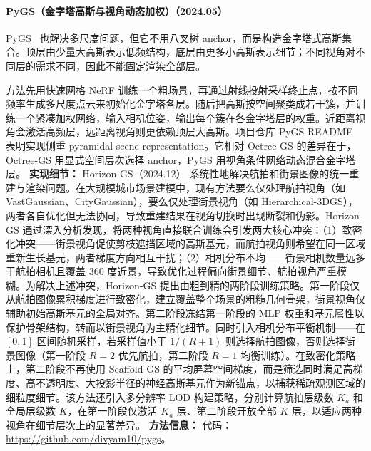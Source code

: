 \paragraph{PyGS（金字塔高斯与视角动态加权）（2024.05）}
PyGS~\cite{2405_16829} 也解决多尺度问题，但它不用八叉树 anchor，而是构造金字塔式高斯集合。顶层由少量大高斯表示低频结构，底层由更多小高斯表示细节；不同视角对不同层的需求不同，因此不能固定渲染全部层。

方法先用快速网格 NeRF 训练一个粗场景，再通过射线投射采样终止点，按不同频率生成多尺度点云来初始化金字塔各层。随后把高斯按空间聚类成若干簇，并训练一个紧凑加权网络，输入相机位姿，输出每个簇在各金字塔层的权重。近距离视角会激活高频层，远距离视角则更依赖顶层大高斯。项目仓库 PyGS README 表明实现侧重 pyramidal scene representation。它相对 Octree-GS 的差异在于，Octree-GS 用显式空间层次选择 anchor，PyGS 用视角条件网络动态混合金字塔层。
\textbf{实现细节：} Horizon-GS（2024.12） 系统性地解决航拍和街景图像的统一重建与渲染问题。在大规模城市场景建模中，现有方法要么仅处理航拍视角（如 VastGaussian、CityGaussian），要么仅处理街景视角（如 Hierarchical-3DGS），两者各自优化但无法协同，导致重建结果在视角切换时出现断裂和伪影。Horizon-GS 通过深入分析发现，将两种视角直接联合训练会引发两大核心冲突：（1）致密化冲突——街景视角促使剪枝遮挡区域的高斯基元，而航拍视角则希望在同一区域重新生长基元，两者梯度方向相互干扰；（2）相机分布不均——街景相机数量远多于航拍相机且覆盖 360 度近景，导致优化过程偏向街景细节、航拍视角严重模糊。为解决上述冲突，Horizon-GS 提出由粗到精的两阶段训练策略。第一阶段仅从航拍图像累积梯度进行致密化，建立覆盖整个场景的粗糙几何骨架，街景视角仅辅助初始高斯基元的全局对齐。第二阶段冻结第一阶段的 MLP 权重和基元属性以保护骨架结构，转而以街景视角为主精化细节。同时引入相机分布平衡机制——在 $[0,1]$ 区间随机采样，若采样值小于 $1/(R+1)$ 则选择航拍图像，否则选择街景图像（第一阶段 $R\!=\!2$ 优先航拍，第二阶段 $R\!=\!1$ 均衡训练）。在致密化策略上，第二阶段不再使用 Scaffold-GS 的平均屏幕空间梯度，而是筛选同时满足高梯度、高不透明度、大投影半径的神经高斯基元作为新锚点，以捕获稀疏观测区域的细粒度细节。该方法还引入多分辨率 LOD 构建策略，分别计算航拍层级数 $K_a$ 和全局层级数 $K$，在第一阶段仅激活 $K_a$ 层、第二阶段开放全部 $K$ 层，以适应两种视角在细节层次上的显著差异。
\textbf{方法信息：} 代码：\url{https://github.com/divyam10/pygs}。
